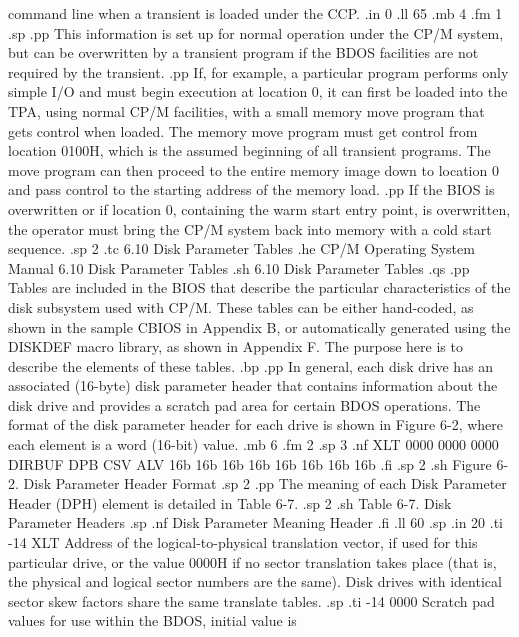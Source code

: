 command line when a transient is loaded under the CCP.
.in 0
.ll 65
.mb 4
.fm 1
.sp
.pp
This information is set up for normal operation under the CP/M 
system, but can be overwritten by a transient program if the BDOS 
facilities are not required by the transient.
.pp
If, for example, a particular program performs only simple I/O 
and must begin execution at location 0, it can first be loaded 
into the TPA, using normal CP/M facilities, with a small memory 
move program that gets control when loaded.  The memory move 
program must get control from location 0100H, which is the 
assumed beginning of all transient programs.  The move program can
then proceed to the entire memory image down to location 0 and 
pass control to the starting address of the memory load.
.pp
If the BIOS is overwritten or if location 0, containing the warm 
start entry point, is overwritten, the operator must bring the 
CP/M system back into memory with a cold start sequence.
.sp 2
.tc    6.10  Disk Parameter Tables
.he CP/M Operating System Manual          6.10  Disk Parameter Tables
.sh
6.10  Disk Parameter Tables
.qs
.pp
Tables are included in the BIOS that describe the particular 
characteristics of the disk subsystem used with CP/M.  These 
tables can be either hand-coded, as shown in the sample CBIOS in 
Appendix B, or automatically generated using the DISKDEF macro 
library, as shown in Appendix F.  The purpose here is to describe 
the elements of these tables.
.bp
.pp
In general, each disk drive has an associated (16-byte) disk 
parameter header that contains information about the disk drive 
and provides a scratch pad area for certain BDOS operations.  The 
format of the disk parameter header for each drive is shown 
in Figure 6-2, where each element is a word (16-bit) value.
.mb 6
.fm 2
.sp 3
.nf
XLT     0000     0000     0000     DIRBUF     DPB     CSV     ALV
16b     16b      16b      16b      16b        16b     16b     16b
.fi
.sp 2
.sh
            Figure 6-2.  Disk Parameter Header Format
.sp 2
.pp
The meaning of each Disk Parameter Header (DPH) element is detailed in Table
6-7.
.sp 2
.sh
               Table 6-7.  Disk Parameter Headers
.sp
.nf
  Disk Parameter                 Meaning
      Header
.fi
.ll 60
.sp
.in 20
.ti -14
XLT           Address of the logical-to-physical translation vector, if used
for this particular drive, or the value 0000H if no sector translation
takes place (that is, the physical and logical sector numbers are the same).
Disk drives with identical sector skew factors share the same translate tables.
.sp
.ti -14
0000          Scratch pad values for use within the BDOS, initial value is
